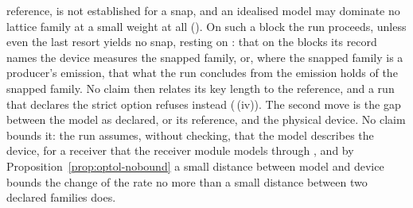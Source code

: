 \begin{remark}
reference, is not established for a snap, and an idealised model may
dominate no lattice family at a small weight at all
(). On such a block the run proceeds,
unless even the last resort yields no snap, resting on
: that on the blocks its record
names the device measures the snapped family, or, where the snapped family is
a producer's emission, that what the run concludes from the emission holds
of the snapped family. No claim then relates its key length to the
reference, and a run that declares the strict option refuses instead
(\,(iv)). The second move is
the gap between the model as declared, or its reference, and the physical
device. No claim bounds it: the run assumes, without checking, that the
model describes the device, for a receiver that the receiver module models
through , and by
Proposition~\ref{prop:optol-nobound} a small distance between model and
device bounds the change of the rate no more than a small distance between
two declared families does.
\end{remark}
